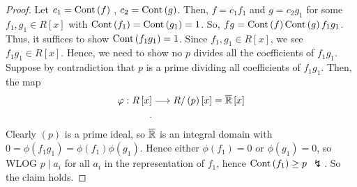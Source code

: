 \begin{proof}
	Let \(c_1 = \operatorname{Cont}\left( f \right) \) , \(c_2 =\operatorname{Cont}\left( g \right) \). Then, \(f = c_1 f_1\) and \(g = c_2 g_1\) for some \(f_1, g_1 \in R\left[ x \right] \) with \(\operatorname{Cont}\left( f_1 \right)  = \operatorname{Cont}\left( g_1 \right)  = 1\). So, \(fg = \operatorname{Cont}\left( f \right) \operatorname{Cont}\left( g \right) f_1g_1\).\\
	Thus, it suffices to show \(\operatorname{Cont}\left( f_1g_1 \right) = 1 \). Since \(f_1, g_1 \in R\left[ x \right]  \), we see \(f_1g_1 \in R\left[ x \right] \). Hence, we need to show no \(p\) divides all the coefficients of \(f_1g_1\). Suppose by contradiction that \(p\) is a prime dividing all coefficients of \(f_1g_1\). Then, the map \begin{align*}
		\varphi: R\left[ x \right]  &\longrightarrow R / \left( p \right) \left[ x \right]   = \overline{\mathbb{R}}\left[ x \right] \\
	.\end{align*}
Clearly \(\left( p \right) \) is a prime ideal, so \(\overline{\mathbb{R}}\) is an integral domain with \( 0 = \phi\left( f_1g_1 \right) = \phi\left( f_1 \right) \phi\left( g_1 \right) \). Hence either \(\phi\left( f_1 \right) = 0\) or \(\phi\left( g_1 \right) = 0\), so WLOG \(p \mid a_{i}\) for all \(a_{i}\) in the representation of \(f_1\), hence \(\operatorname{Cont}\left( f_1 \right) \ge p \) \(\lightning\). So the claim holds.
\end{proof}
